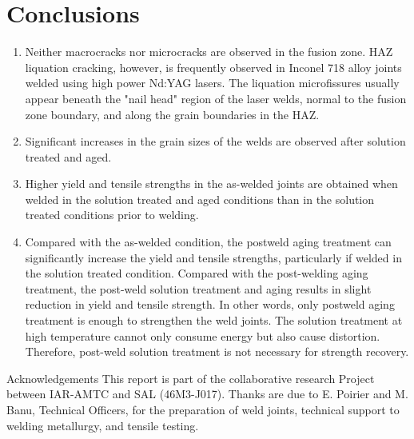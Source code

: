 \documentclass[10pt]{article}
\begin{document}
\section*{Conclusions}
\begin{enumerate}
  \item Neither macrocracks nor microcracks are observed in the fusion zone. HAZ liquation cracking, however, is frequently observed in Inconel 718 alloy joints welded using high power Nd:YAG lasers. The liquation microfissures usually appear beneath the "nail head" region of the laser welds, normal to the fusion zone boundary, and along the grain boundaries in the HAZ.

  \item Significant increases in the grain sizes of the welds are observed after solution treated and aged.

  \item Higher yield and tensile strengths in the as-welded joints are obtained when welded in the solution treated and aged conditions than in the solution treated conditions prior to welding.

  \item Compared with the as-welded condition, the postweld aging treatment can significantly increase the yield and tensile strengths, particularly if welded in the solution treated condition. Compared with the post-welding aging treatment, the post-weld solution treatment and aging results in slight reduction in yield and tensile strength. In other words, only postweld aging treatment is enough to strengthen the weld joints. The solution treatment at high temperature cannot only consume energy but also cause distortion. Therefore, post-weld solution treatment is not necessary for strength recovery.

\end{enumerate}

Acknowledgements This report is part of the collaborative research Project between IAR-AMTC and SAL (46M3-J017). Thanks are due to E. Poirier and M. Banu, Technical Officers, for the preparation of weld joints, technical support to welding metallurgy, and tensile testing.
\end{document}
